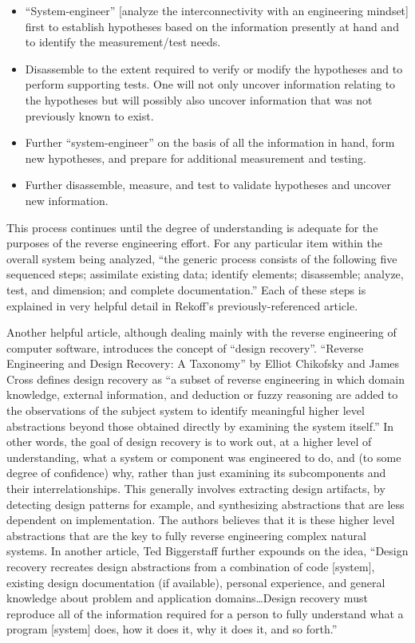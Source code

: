\begin{itemize}
\item 
“System-engineer” [analyze the interconnectivity with an engineering
mindset] first to establish hypotheses based on the information
presently at hand and to identify the measurement/test needs.
\item 
Disassemble to the extent required to verify or modify the hypotheses
and to perform supporting tests. One will not only uncover information
relating to the hypotheses but will possibly also uncover information
that was not previously known to exist.
\item 
Further “system-engineer” on the basis of all the information in hand,
form new hypotheses, and prepare for additional measurement and
testing.
\item 
Further disassemble, measure, and test to validate hypotheses and
uncover new information.
\end{itemize}

This process continues until the degree of understanding is adequate for
the purposes of the reverse engineering effort. For any particular item
within the overall system being analyzed, “the generic process consists
of the following five sequenced steps; assimilate existing data;
identify elements; disassemble; analyze, test, and dimension; and
complete documentation.” Each of these steps is explained in very
helpful detail in Rekoff’s previously-referenced article.

Another helpful article, although dealing mainly with the reverse
engineering of computer software, introduces the concept of “design
recovery”. “Reverse Engineering and Design Recovery: A Taxonomy” by
Elliot Chikofsky and James Cross defines design recovery as “a subset
of reverse engineering in which domain knowledge, external information,
and deduction or fuzzy reasoning are added to the observations of the
subject system to identify meaningful higher level abstractions beyond
those obtained directly by examining the system
itself.”\citep{chikofskycross1990}
In other words, the goal of design
recovery is to work out, at a higher level of understanding, what a
system or component was engineered to do, and (to some degree of
confidence) why, rather than just examining its subcomponents and their
interrelationships. This generally involves extracting design
artifacts, by detecting design patterns for example, and synthesizing
abstractions that are less dependent on implementation. The authors
believes that it is these higher level abstractions that are the key to
fully reverse engineering complex natural systems. In another article,
Ted Biggerstaff further expounds on the idea, “Design recovery
recreates design abstractions from a combination of code [system],
existing design documentation (if available), personal experience, and
general knowledge about problem and application domains…Design recovery
must reproduce all of the information required for a person to fully
understand what a program [system] does, how it does it, why it does
it, and so forth.”\citep{biggerstaff1989}

